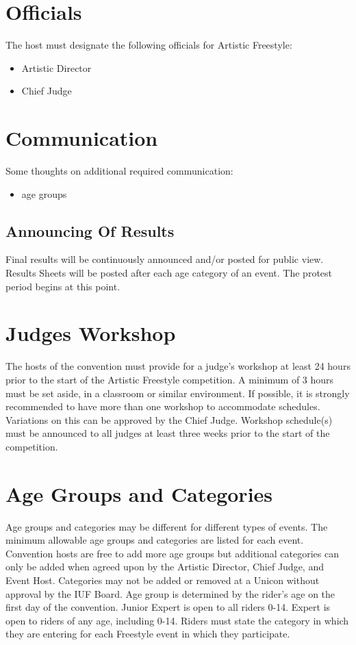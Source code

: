 \section{Officials}

The host must designate the following officials for Artistic Freestyle:
\begin{itemize}
\item Artistic Director
\item Chief Judge
\end{itemize}

\section{Communication}

\begin{comment2016}
Some thoughts on additional required communication:
\begin{itemize}
\item age groups
\end{itemize}
\end{comment2016}

\subsection{Announcing Of Results}

Final results will be continuously announced and/or posted for public view.
Results Sheets will be posted after each age category of an event.
The protest period begins at this point.

\section{Judges Workshop}

The hosts of the convention must provide for a judge's workshop at least 24 hours prior to the start of the Artistic Freestyle competition.
A minimum of 3 hours must be set aside, in a classroom or similar environment.%
If possible, it is strongly recommended to have more than one workshop to accommodate schedules.%
Variations on this can be approved by the Chief Judge.
Workshop schedule(s) must be announced to all judges at least three weeks prior to the start of the competition.

\section{Age Groups and Categories}
Age groups and categories may be different for different types of events.
The minimum allowable age groups and categories are listed for each event.
Convention hosts are free to add more age groups but additional categories can only be added when agreed upon by the Artistic Director, Chief Judge, and Event Host.
Categories may not be added or removed at a Unicon without approval by the IUF Board.
Age group is determined by the rider's age on the first day of the convention.
Junior Expert is open to all riders 0-14.
Expert is open to riders of any age, including 0-14.
Riders must state the category in which they are entering for each Freestyle event in which they participate.

